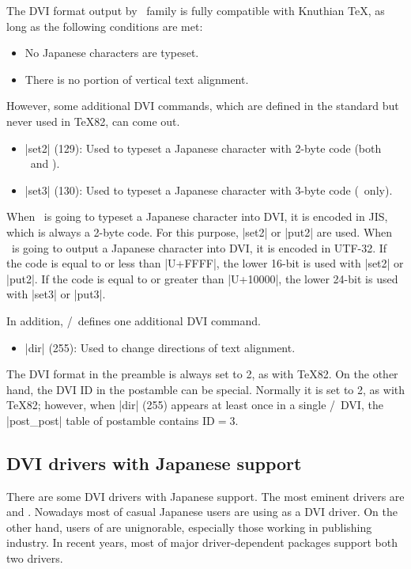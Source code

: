 \documentclass[a4paper,11pt,dvipdfmx]{article}
\let\emph=\origemph
\begin{document}
The DVI format output by \pTeX\ family is fully compatible with
Knuthian \TeX, as long as the following conditions are met:
\begin{itemize}
  \item No Japanese characters are typeset.
  \item There is no portion of vertical text alignment.
\end{itemize}

However, some additional DVI commands, which are defined in the
standard \cite{dvistd0} but never used in \TeX82, can come out.
\begin{itemize}
  \item |set2| (129): %
    Used to typeset a Japanese character with 2-byte code
    (both \pTeX\ and \upTeX).
  \item |set3| (130): %
    Used to typeset a Japanese character with 3-byte code
    (\upTeX\ only).
\end{itemize}
When \pTeX\ is going to typeset a Japanese character into DVI,
it is encoded in JIS, which is always a 2-byte code.
For this purpose, |set2| or |put2| are used.
When \upTeX\ is going to output a Japanese character into DVI,
it is encoded in UTF-32.
If the code is equal to or less than |U+FFFF|,
the lower 16-bit is used with |set2| or |put2|.
If the code is equal to or greater than |U+10000|,
the lower 24-bit is used with |set3| or |put3|.

In addition, \pTeX/\upTeX\ defines one additional DVI command.
\begin{itemize}
  \item |dir| (255):
    Used to change directions of text alignment.
\end{itemize}
The DVI format in the preamble is always set to 2, as with \TeX82.
On the other hand, the DVI ID in the postamble can be special.
Normally it is set to 2, as with \TeX82; however,
when |dir| (255) appears at least once in a single \pTeX/\upTeX\ DVI,
the |post_post| table of postamble contains $\mathrm{ID} = 3$.

\subsection{DVI drivers with Japanese support}

There are some DVI drivers with Japanese support.
The most eminent drivers are \emph{dvips} and \emph{dvipdfmx}.
Nowadays most of casual Japanese users are using \emph{dvipdfmx} as a DVI driver.
On the other hand, users of \emph{dvips} are unignorable, especially those
working in publishing industry.
In recent years, most of major driver-dependent packages support
both two drivers.
\end{document}
